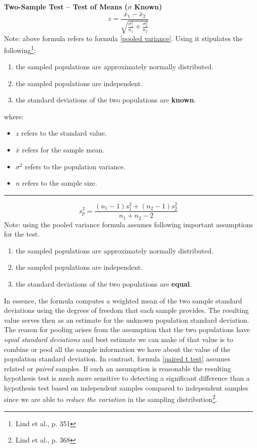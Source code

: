 \documentclass[	DIV=calc,%
							paper=a4,%
							fontsize=11pt,%
							twocolumn]{scrartcl} %
\newcommand{\hformbar}[1]{\vspace{5pt}\hrule\vspace{10pt}} %
\newcommand{\formdesc}[1]{\noindent\textbf{#1}}
\begin{document}
\formdesc{Two-Sample Test -- Test of Means ($\sigma$ Known)}
\begin{equation}
\label{two-sample test of means sigma known}
z = \frac{\bar{x}_{1} - \bar{x}_{2}}{\sqrt{\frac{\sigma^{2}_{1}}{{n}_{1}}+\frac{{\sigma}^{2}_{2}}{n_{2}}}}
\end{equation}
Note: above formula refers to formula \eqref{pooled variance}. Using it stipulates the following\footnote{Lind et al., p. 351}:
\begin{enumerate}
 \item the sampled populations are approximately normally distributed.
 \item the sampled populations are independent.
 \item the standard deviations of the two populations are \textbf{known}.
\end{enumerate}
where: 
\begin{itemize}
 \item $z$ refers to the standard value.
 \item $\bar{x}$ refers for the sample mean.
 \item $\sigma^{2}$ refers to the population variance.
 \item $n$ refers to the sample size. 
\end{itemize}
\hformbar


\formdesc{Two-Sample Test -- Pooled Variance ($\sigma$ Unknown)}
\begin{equation}
\label{pooled variance}
s^{2}_{p} = \frac{(n_{1} - 1)s^{2}_{1} + (n_{2}-1)s^{2}_{2}}{n_{1}+n_{2} -2}
\end{equation}
Note: using the pooled variance formula assumes following important assumptions for the test.
\begin{enumerate}
 \item the sampled populations are approximately normally distributed.
 \item the sampled populations are independent.
 \item the standard deviations of the two populations are \textbf{equal}.
\end{enumerate}
In essence, the formula computes a weighted mean of the two sample standard deviations using the degrees of freedom that each sample provides. The resulting value serves then as an estimate for the unknown population standard deviation. The reason for pooling arises from the assumption that the two populations have \emph{equal standard deviations} and best estimate we can make of that value is to combine or pool all the sample information we have about the value of the population standard deviation. In contrast, formula \eqref{paired t test} assumes related or \emph{paired} samples. If such an assumption is reasonable the resulting hypothesis test is much more sensitive to detecting a significant difference than a hypothesis test based on independent samples compared to independent samples since we are able to \emph{reduce the variation} in the sampling distribution\footnote{Lind et al., p. 368}.
\end{document}
